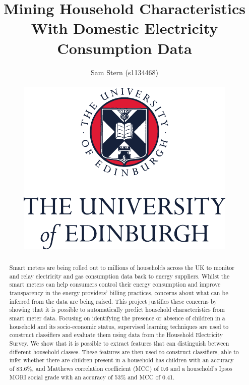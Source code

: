 \documentclass[12pt,a4paper]{report}
\author{%
Sam Stern (s1134468)
\\ \\
	\includegraphics[]{fig/UoE_Logo}
	}
\title{Mining Household Characteristics With Domestic Electricity Consumption Data}
\begin{document}
\maketitle

\begin{abstract}
Smart meters are being rolled out to millions of households across the UK to monitor and relay electricity and gas consumption data back to energy suppliers. Whilst the smart meters can help consumers control their energy consumption and improve transparency in the energy providers' billing practices, concerns about what can be inferred from the data are being raised. This project justifies these concerns by showing that it is possible to automatically predict household characteristics from smart meter data. Focusing on identifying the presence or absence of children in a household and its socio-economic status, supervised learning techniques are used to construct classifiers and evaluate them using data from the Household Electricity Survey. We show that it is possible to extract features that can distinguish between different household classes. These features are then used to construct classifiers, able to infer whether there are children present in a household has children with an accuracy of 83.6\%, and Matthews correlation coefficient (MCC) of 0.6 and a household's Ipsos MORI social grade with an accuracy of 53\% and MCC of 0.41.

\end{abstract}

\tableofcontents



















\end{document}
